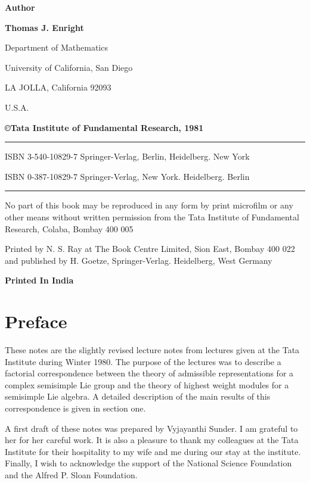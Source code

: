 \thispagestyle{empty}
\begin{center}
{\bf Author}\\
\bigskip

{\large\bf Thomas J. Enright}
\medskip

Department of Mathematics
\medskip

University of California, San Diego
\medskip

LA JOLLA, California 92093
\medskip

U.S.A.
\vfill

{\bf\copyright \quad  Tata Institute of Fundamental Research, 1981}
\vfill

\noindent\rule{\textwidth}{1pt}
\smallskip

ISBN 3-540-10829-7 Springer-Verlag, Berlin, Heidelberg. New York

ISBN 0-387-10829-7 Springer-Verlag, New York. Heidelberg. Berlin
\smallskip

\noindent\rule{\textwidth}{1pt}
\vfill

\parbox{0.7\textwidth}{No part of this book may be reproduced in any form
by print microfilm or any other means without
written permission from the Tata Institute of
Fundamental Research, Colaba, Bombay 400 005}
\vfill

\parbox{0.7\textwidth}{Printed by N. S. Ray at The Book Centre Limited,
Sion East, Bombay 400 022 and published by H. Goetze,
Springer-Verlag. Heidelberg, West Germany}
\vfill

{\bf Printed In India} 
\end{center}


\chapter{Preface}


These notes are the slightly revised lecture notes from lectures given
at the Tata Institute during Winter 1980. The purpose of the lectures
was to describe a factorial correspondence between the theory of
admissible representations for a complex semisimple Lie group and the
theory of highest weight modules for a semisimple Lie algebra. A
detailed description of the main results of this correspondence is
given in section one. 

A first draft of these notes was prepared by Vyjayanthi Sunder. I am
grateful to her for her careful work. It is also a pleasure to thank
my colleagues at the Tata Institute for their hospitality to my wife
and me during our stay at the institute. Finally, I wish to
acknowledge the support of the National Science Foundation and the
Alfred P. Sloan Foundation. 
